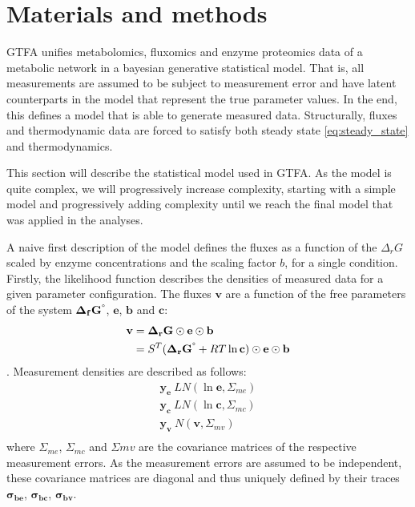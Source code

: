 \documentclass[10pt,letterpaper]{article}
\newcommand{\sdgf}{\Delta_fG^{\degree}}
\newcommand{\dgr}{\Delta_rG}
\newcommand{\sdgr}{\Delta_rG^{\degree}}
\newcommand{\bsdgf}{\mathbf{\sdgf}}
\newcommand{\bdgr}{\mathbf{\dgr}}
\newcommand{\bsdgr}{\mathbf{\sdgr}}
\newcommand{\be}{\mathbf{e}}
\newcommand{\bc}{\mathbf{c}}
\newcommand{\bb}{\mathbf{b}}
\newcommand{\bv}{\mathbf{v}}
\begin{document}

\section*{Materials and methods}

GTFA unifies metabolomics, fluxomics and enzyme proteomics data of a metabolic network in a bayesian generative statistical model.
That is, all measurements are assumed to be subject to measurement error and have latent counterparts in the model that represent the true parameter values.
In the end, this defines a model that is able to generate measured data.
Structurally, fluxes and thermodynamic data are forced to satisfy both steady state \ref{eq:steady_state} and thermodynamics.

This section will describe the statistical model used in GTFA.
As the model is quite complex, we will progressively increase complexity, starting with a simple model and progressively adding complexity until we reach the final model that was applied in the analyses.

A naive first description of the model defines the fluxes as a function of the $\dgr$ scaled by enzyme concentrations and the scaling factor $b$, for a single condition.
Firstly, the likelihood function describes the densities of measured data for a given parameter configuration.
The fluxes $\bv$ are a function of the free parameters of the system $\bsdgf$, $\be$, $\bb$ and $\bc$:
\begin{align}
    \bv &= \bdgr \odot \be \odot \bb \\
        &= S^T (\bsdgr + RT\ln{\bc}) \odot \be \odot \bb \\
\end{align}
.
Measurement densities are described as follows:
\begin{align*}
    \mathbf{y_{e}} ~ LN(\ln{\be}, \Sigma_{me}) \\
    \mathbf{y_{c}} ~ LN(\ln{\bc}, \Sigma_{mc}) \\
    \mathbf{y_{v}} ~ N(\bv, \Sigma_{mv}) \\
\end{align*}
where $\Sigma_{me}$, $\Sigma_{mc}$ and $\Sigma{mv}$ are the covariance matrices of the respective measurement errors.
As the measurement errors are assumed to be independent, these covariance matrices are diagonal and thus uniquely defined by their traces $\mathbf{\sigma_{be}}$, $\mathbf{\sigma_{bc}}$, $\mathbf{\sigma_{bv}}$.
\end{document}
